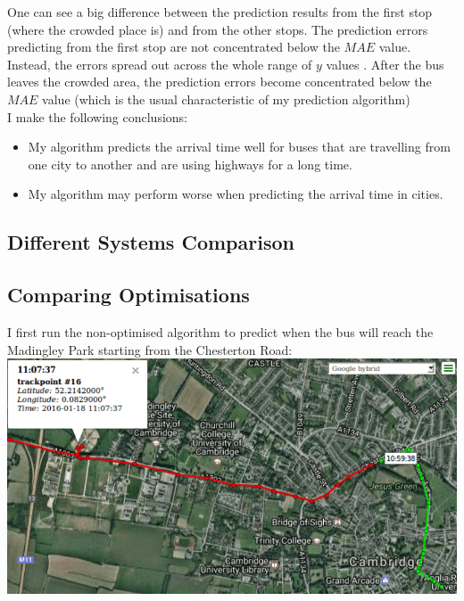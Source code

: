 \documentclass[12pt,a4paper,oneside,openright]{report}
\begin{document}
One can see a big difference between the prediction results from the first stop (where the
crowded place is) and from the other stops. The prediction errors predicting from
the first stop are not concentrated below the $MAE$ value. Instead, the errors spread out
across the whole range of $y$ values . After the bus leaves the crowded area, the prediction
errors become concentrated below the $MAE$ value (which is the usual characteristic of my
prediction algorithm) \\

I make the following conclusions:

\begin{itemize}

    \item My algorithm predicts the arrival time well for buses that are travelling from one city
    to another and are using highways for a long time.

    \item My algorithm may perform worse when predicting the arrival time in cities.


\end{itemize}



\newpage

\subsection{Different Systems Comparison}

\subsection*{Comparing Optimisations}

I first run the non-optimised algorithm to predict when the bus will reach the
Madingley Park starting from the Chesterton Road: \\

\includegraphics[width=\textwidth]{figs/madingley.png} \\
\end{document}
